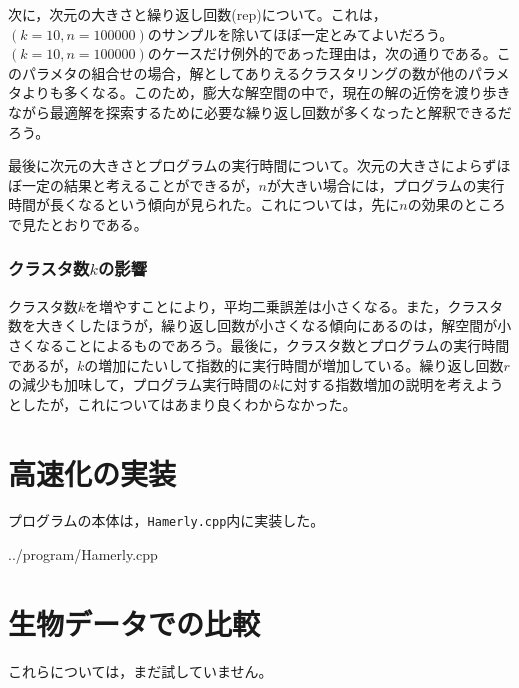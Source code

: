\documentclass[10pt,a4,uplatex]{jsarticle}
\begin{document}
次に，次元の大きさと繰り返し回数(rep)について。これは，$(k = 10, n = 100000)$のサンプルを除いてほぼ一定とみてよいだろう。$(k = 10, n = 100000)$のケースだけ例外的であった理由は，次の通りである。このパラメタの組合せの場合，解としてありえるクラスタリングの数が他のパラメタよりも多くなる。このため，膨大な解空間の中で，現在の解の近傍を渡り歩きながら最適解を探索するために必要な繰り返し回数が多くなったと解釈できるだろう。

最後に次元の大きさとプログラムの実行時間について。次元の大きさによらずほぼ一定の結果と考えることができるが，$n$が大きい場合には，プログラムの実行時間が長くなるという傾向が見られた。これについては，先に$n$の効果のところで見たとおりである。

\subsubsection{クラスタ数$k$の影響}
クラスタ数$k$を増やすことにより，平均二乗誤差は小さくなる。また，クラスタ数を大きくしたほうが，繰り返し回数が小さくなる傾向にあるのは，解空間が小さくなることによるものであろう。最後に，クラスタ数とプログラムの実行時間であるが，$k$の増加にたいして指数的に実行時間が増加している。繰り返し回数$r$の減少も加味して，プログラム実行時間の$k$に対する指数増加の説明を考えようとしたが，これについてはあまり良くわからなかった。

\section{高速化の実装}
プログラムの本体は，\verb+Hamerly.cpp+内に実装した。

{../program/Hamerly.cpp}


\section{生物データでの比較}
これらについては，まだ試していません。

\end{document}
